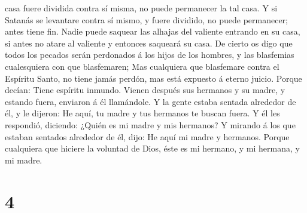 casa fuere dividida contra sí misma, no puede permanecer la tal casa.
 Y si Satanás se levantare contra sí mismo, y fuere
dividido, no puede permanecer; antes tiene fin.  Nadie
puede saquear las alhajas del valiente entrando en su casa, si antes no
atare al valiente y entonces saqueará su casa.  De cierto
os digo que todos los pecados serán perdonados á los hijos de los
hombres, y las blasfemias cualesquiera con que blasfemaren;
 Mas cualquiera que blasfemare contra el Espíritu Santo,
no tiene jamás perdón, mas está expuesto á eterno juicio.
 Porque decían: Tiene espíritu inmundo. 
Vienen después sus hermanos y su madre, y estando fuera, enviaron á él
llamándole.  Y la gente estaba sentada alrededor de él, y
le dijeron: He aquí, tu madre y tus hermanos te buscan fuera.
 Y él les respondió, diciendo: ¿Quién es mi madre y mis
hermanos?  Y mirando á los que estaban sentados alrededor
de él, dijo: He aquí mi madre y hermanos.  Porque
cualquiera que hiciere la voluntad de Dios, éste es mi hermano, y mi
hermana, y mi madre.

\hypertarget{section-3}{%
\section{4}\label{section-3}}

